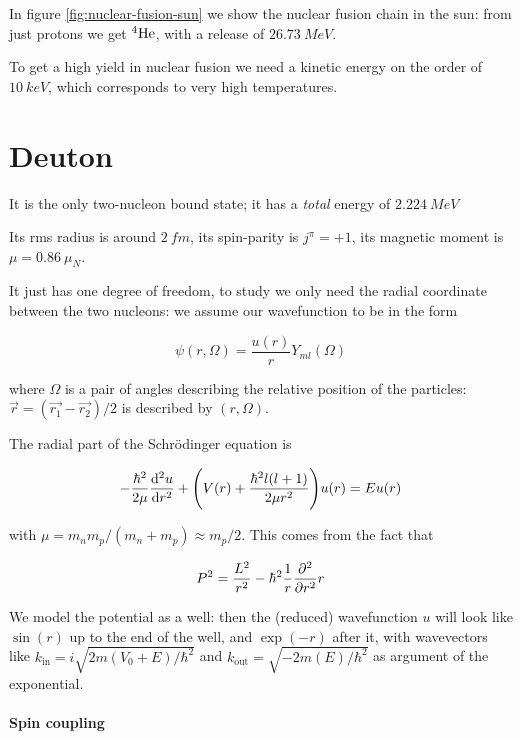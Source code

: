 \documentclass[main.tex]{subfiles}
\begin{document}
In figure \ref{fig:nuclear-fusion-sun} we show the nuclear fusion chain in the sun: from just protons we get \(^{4} \ce{He} \), with a release of \(\SI{26.73}{MeV} \).

To get a high yield in nuclear fusion we need a kinetic energy on the order of \(\SI{10}{keV} \), which corresponds to very high temperatures.

\section{Deuton}

It is the only two-nucleon bound state; it has a \emph{total}  energy of \(\SI{2.224}{MeV} \)

Its rms radius is around \(\SI{2}{fm} \), its spin-parity is \(j^\pi = +1\), its magnetic moment is \(\mu = \SI{0.86}{} \mu_N \).

It just has one degree of freedom, to study we only need the radial coordinate between the two nucleons: we assume our wavefunction to be in the form

\begin{equation}
    \psi(r, \Omega) = \frac{u(r)}{r} Y_{ml} (\Omega)
\end{equation}

where \(\Omega\) is a pair of angles describing the relative position of the particles: \(\vec{r} = (\vec{r_1} - \vec{r_2})/2 \) is described by \((r, \Omega)\).

The radial part of the Schrödinger equation is

\begin{equation} \label{eq:deuton-radial-shroed}
    -\frac{\hbar^2}{2\mu} \dv[2]{u}{r}  + \qty(
    V(r) + \frac{\hbar^2 l (l+1)}{2 \mu r^2}
    ) u(r) = E u(r)
\end{equation}

with \(\mu = m_n m_p / (m_n + m_p) \approx m_p /2\). This comes from the fact that

\begin{equation}
    P^2 = \frac{L^2}{r^2} - \hbar^2 \frac{1}{r} \pdv[2]{}{r}r
\end{equation}

We model the potential as a well: then the (reduced) wavefunction \(u\) will look like \(\sin(r) \) up to the end of the well, and \(\exp(-r) \) after it, with wavevectors like \(k_{\text{in}} = i \sqrt{2m(V_0 + E) /\hbar^2} \) and \(k_{\text{out}} = \sqrt{-2m(E)/\hbar^2} \) as argument of the exponential.

\paragraph{Spin coupling}
\end{document}
